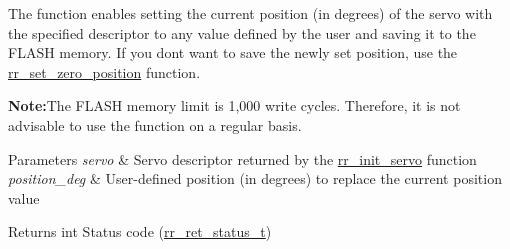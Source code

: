 The function enables setting the current position (in degrees) of the servo with the specified descriptor to any value defined by the user and saving it to the F\+L\+A\+SH memory. If you don\textquotesingle{}t want to save the newly set position, use the \hyperlink{group___servo__config_gab68e78b8a0d2a9ac38b9a72d78acab85}{rr\+\_\+set\+\_\+zero\+\_\+position} function.~\newline
 

{\bfseries Note\+:}The F\+L\+A\+SH memory limit is 1,000 write cycles. Therefore, it is not advisable to use the function on a regular basis.


\begin{DoxyParams}{Parameters}
{\em servo} & Servo descriptor returned by the \hyperlink{group___common_ga0adb313a3eeb8a4399431e940a1f3e9e}{rr\+\_\+init\+\_\+servo} function \\
\hline
{\em position\+\_\+deg} & User-\/defined position (in degrees) to replace the current position value \\
\hline
\end{DoxyParams}
\begin{DoxyReturn}{Returns}
int Status code (\hyperlink{api_8h_a92d5be5038abcf89837faf85a08debdc}{rr\+\_\+ret\+\_\+status\+\_\+t}) 
\end{DoxyReturn}
